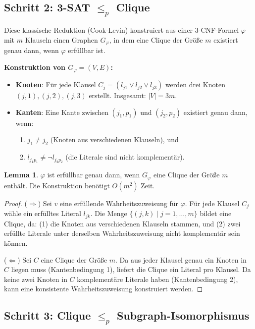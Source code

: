 ﻿\documentclass[a4paper,12pt]{article}
\theoremstyle{definition}
\newtheorem{lemma}{Lemma}
\begin{document}
\subsection{Schritt 2: 3-SAT $\leq_p$ Clique}

Diese klassische Reduktion (Cook-Levin) konstruiert aus einer 3-CNF-Formel $\varphi$ mit $m$ Klauseln einen Graphen $G_\varphi$, in dem eine Clique der Größe $m$ existiert genau dann, wenn $\varphi$ erfüllbar ist.

\textbf{Konstruktion von $G_\varphi = (V, E)$:}
\begin{itemize}
    \item[-] \textbf{Knoten}: Für jede Klausel $C_j = (l_{j1} \lor l_{j2} \lor l_{j3})$ werden drei Knoten $(j, 1), (j, 2), (j, 3)$ erstellt. Insgesamt: $|V| = 3m$.
    \item[-] \textbf{Kanten}: Eine Kante zwischen $(j_1, p_1)$ und $(j_2, p_2)$ existiert genau dann, wenn:
    \begin{enumerate}
        \item $j_1 \neq j_2$ (Knoten aus verschiedenen Klauseln), und
        \item $l_{j_1 p_1} \neq \neg l_{j_2 p_2}$ (die Literale sind nicht komplementär).
    \end{enumerate}
\end{itemize}

\begin{lemma}
    $\varphi$ ist erfüllbar genau dann, wenn $G_\varphi$ eine Clique der Größe $m$ enthält. Die Konstruktion benötigt $O(m^2)$ Zeit.
\end{lemma}

\begin{proof}
    ($\Rightarrow$) Sei $v$ eine erfüllende Wahrheitszuweisung für $\varphi$. Für jede Klausel $C_j$ wähle ein erfülltes Literal $l_{jk}$. Die Menge $\{(j, k) \mid j = 1, \ldots, m\}$ bildet eine Clique, da: (1) die Knoten aus verschiedenen Klauseln stammen, und (2) zwei erfüllte Literale unter derselben Wahrheitszuweisung nicht komplementär sein können.
    
    ($\Leftarrow$) Sei $C$ eine Clique der Größe $m$. Da aus jeder Klausel genau ein Knoten in $C$ liegen muss (Kantenbedingung 1), liefert die Clique ein Literal pro Klausel. Da keine zwei Knoten in $C$ komplementäre Literale haben (Kantenbedingung 2), kann eine konsistente Wahrheitszuweisung konstruiert werden.
\end{proof}

\subsection{Schritt 3: Clique $\leq_p$ Subgraph-Isomorphismus}
\end{document}
